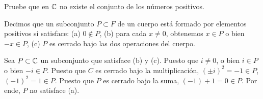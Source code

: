 \begin{exercise}
Pruebe que en $\mathbb C$ no existe el conjunto de los números positivos.
\end{exercise}

\begin{remark}
Decimos que un subconjunto $P \subset F$ de un cuerpo está formado por elementos positivos si satisface: (a) $0 \notin P$, (b) para cada $x \ne 0$, obtenemos $x \in P$ o bien $-x \in P$, (c) $P$ es cerrado bajo las dos operaciones del cuerpo.
\end{remark}

\begin{solution}
Sea $P \subset \mathbb C$ un subconjunto que satisface (b) y (c). Puesto que $i \ne 0$, o bien $i \in P$ o bien $-i \in P$. Puesto que $C$ es cerrado bajo la multiplicación, $(\pm i)^2 = -1 \in P$, $(-1)^2 = 1 \in P$. Puesto que $P$ es cerrado bajo la suma, $(-1) + 1 = 0 \in P$. Por ende, $P$ no satisface (a).
\end{solution}
